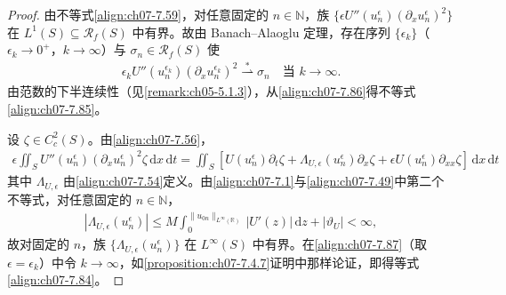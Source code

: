 \documentclass[../../main.tex]{subfiles}%
\begin{document}
\begin{proof}
由不等式\eqref{align:ch07-7.59}，对任意固定的 $n\in\mathbb{N}$，族 $\{\epsilon U''(u_n^\epsilon)(\partial_x u_n^\epsilon)^2\}$ 在 $L^1(S)\subseteq\mathscr{R}_f(S)$ 中有界。故由 Banach--Alaoglu 定理，存在序列 $\{\epsilon_k\}$（$\epsilon_k\to0^+$，$k\to\infty$）与 $\sigma_n\in\mathscr{R}_f(S)$ 使
\begin{align}
\epsilon_k U''(u_n^{\epsilon_k})(\partial_x u_n^{\epsilon_k})^2\stackrel{*}{\rightharpoonup}\sigma_n\quad\text{当 }k\to\infty. \label{align:ch07-7.86}
\end{align}
由范数的下半连续性（见\cref{remark:ch05-5.1.3}），从\eqref{align:ch07-7.86}得不等式\eqref{align:ch07-7.85}。

设 $\zeta\in C^2_c(S)$。由\eqref{align:ch07-7.56}，
\begin{align}
\epsilon\iint_S U''(u_n^\epsilon)(\partial_x u_n^\epsilon)^2\zeta\,\mathrm{d}x\,\mathrm{d}t
=\iint_S[U(u_n^\epsilon)\partial_t\zeta+\Lambda_{U,\epsilon}(u_n^\epsilon)\partial_x\zeta+\epsilon U(u_n^\epsilon)\partial_{xx}\zeta]\,\mathrm{d}x\,\mathrm{d}t \label{align:ch07-7.87}
\end{align}
其中 $\Lambda_{U,\epsilon}$ 由\eqref{align:ch07-7.54}定义。由\eqref{align:ch07-7.1}与\eqref{align:ch07-7.49}中第二个不等式，对任意固定的 $n\in\mathbb{N}$，
\begin{align*}
|\Lambda_{U,\epsilon}(u_n^\epsilon)|\leqslant M\int_0^{\|u_{0n}\|_{L^\infty(\mathbb{R})}}|U'(z)|\,\mathrm{d}z+|\vartheta_U|<\infty,
\end{align*}
故对固定的 $n$，族 $\{\Lambda_{U,\epsilon}(u_n^\epsilon)\}$ 在 $L^\infty(S)$ 中有界。在\eqref{align:ch07-7.87}（取 $\epsilon=\epsilon_k$）中令 $k\to\infty$，如\cref{proposition:ch07-7.4.7}证明中那样论证，即得等式\eqref{align:ch07-7.84}。
\end{proof}
\end{document}
